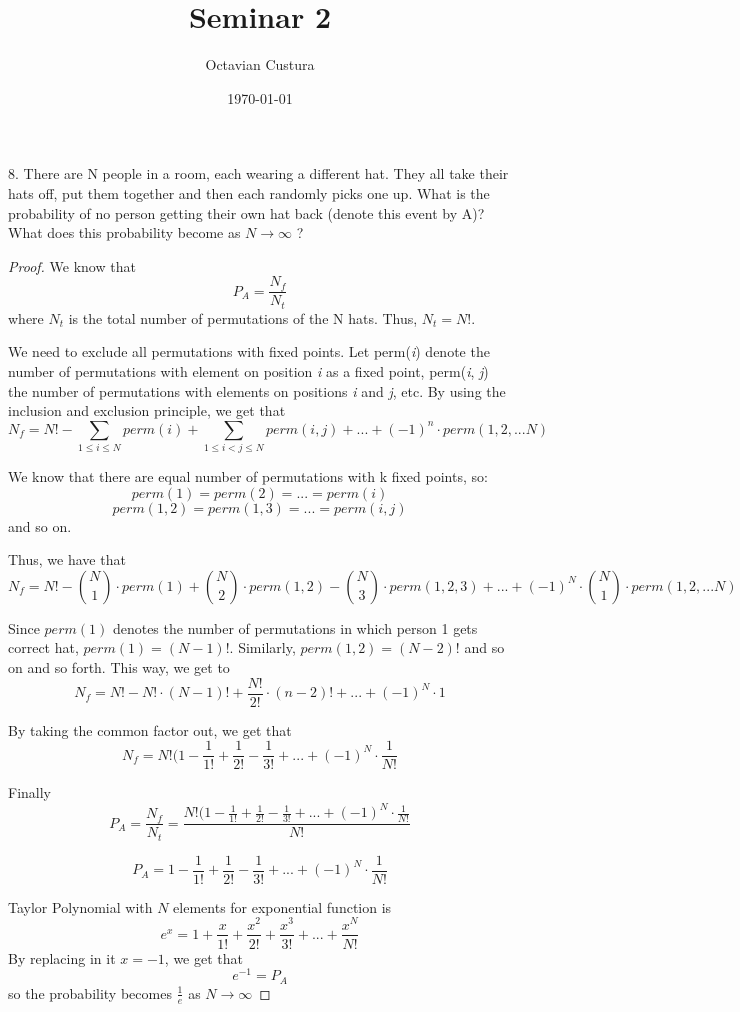 \documentclass[10pt,a4paper]{article}
\author{Octavian Custura}
\title{Seminar 2}
\date{\today}
\begin{document}
\maketitle

8. There are N people in a room, each wearing a different hat. They all take their hats off, put them together and then each randomly picks one up. What is the probability of no person getting their own hat back (denote this event by A)? What does this probability become as $N \rightarrow \infty $ ?

\begin{proof}
We know that \[ P_A = \frac {N_f}{N_t} \] where $N_t$ is the total number of permutations of the N hats. Thus, $N_t = N!$.

We need to exclude all permutations with fixed points. Let perm(\textit{i}) denote the number of permutations with element on position \textit{i} as a fixed point,      perm(\textit{i}, \textit{j}) the number of permutations with elements on positions \textit{i} and \textit{j}, etc. By using the inclusion and exclusion principle, we get that \[ N_f = N! - \sum\limits_{1 \leq i \leq N} perm(i) + \sum\limits_{1 \leq i < j \leq N} perm(i, j) + ... + (-1)^{n} \cdot perm(1, 2, ... N) \]

We know that there are equal number of permutations with k fixed points, so:
\[ perm(1) = perm(2) = ... = perm(i) \]
\[ perm(1, 2) = perm(1, 3) = ... = perm(i, j) \] and so on.

Thus, we have that \[ N_f = N! - \binom{N}{1} \cdot perm(1) + \binom{N}{2} \cdot perm(1, 2) - \binom{N}{3} \cdot perm(1, 2, 3) + ... + (-1)^{N} \cdot \binom{N}{1} \cdot perm(1, 2, ... N) \]

Since $perm(1)$ denotes the number of permutations in which person 1 gets correct hat, $perm(1) = (N - 1)!$. Similarly, $perm(1, 2) = (N - 2)!$ and so on and so forth. This way, we get to \[ N_f = N! - N! \cdot (N - 1)! + \frac{N!}{2!} \cdot (n - 2)! + ... + (-1)^{N} \cdot 1 \]

By taking the common factor out, we get that \[ N_f = N!(1 - \frac{1}{1!} + \frac{1}{2!} - \frac{1}{3!} + ... + (-1)^{N} \cdot \frac{1}{N!} \]

Finally \[ P_A = \frac{N_f}{N_t} = \frac{N!(1 - \frac{1}{1!} + \frac{1}{2!} - \frac{1}{3!} + ... + (-1)^{N} \cdot \frac{1}{N!}}{N!} \]

\[P_A = 1 - \frac{1}{1!} + \frac{1}{2!} - \frac{1}{3!} + ... + (-1)^{N} \cdot \frac{1}{N!} \]

Taylor Polynomial with $N$ elements for exponential function is \[ e^{x} = 1 + \frac{x}{1!} + \frac{x^{2}}{2!} + \frac{x^{3}}{3!} + ... +  \frac{x^{N}}{N!} \]
By replacing in it $x = -1$, we get that \[ e^{-1} = P_A \] so the probability becomes $\frac{1}{e}$ as $N \rightarrow \infty $
\end{proof}
\end{document}
